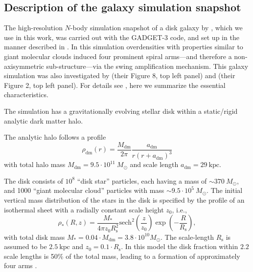 \documentclass[iop,revtex4,numberedappendix,appendixfloats]{emulateapj}
\begin{document}

\subsection{Description of the galaxy simulation snapshot} \label{sec:simulation_description}

The high-resolution $N$-body simulation snapshot of a disk galaxy by \citet{2013ApJ...766...34D}, which we use in this work, was carried out with the GADGET-3 code, and set up in the manner described in \citet{2005MNRAS.361..776S}. In this simulation overdensities with properties similar to giant molecular clouds induced four prominent spiral arms---and therefore a non-axisymmetric sub-structure---via the swing amplification mechanism. This galaxy simulation was also investigated by \citet{2013ApJ...766...34D} (their Figure 8, top left panel) and \citet{2015ApJ...808L...8D} (their Figure 2, top left panel). For details see \citet{2013ApJ...766...34D}, here we summarize the essential characteristics.

The simulation has a gravitationally evolving stellar disk within a static/rigid analytic dark matter halo.

The analytic halo follows a \citet{1990ApJ...356..359H} profile
\begin{equation}
\rho_\text{dm}(r) = \frac{M_\text{dm}}{2\pi} \frac{a_\text{dm}}{r (r+a_\text{dm})^3} \label{eq:dm_hernquist}
\end{equation}
with total halo mass $M_\text{dm} = 9.5\cdot 10^{11} ~M_\odot$ and scale length $a_\text{dm} = 29~\text{kpc}$.

The disk consists of $10^8$ ``disk star'' particles, each having a mass of $\sim370 ~M_\odot$, and 1000 ``giant molecular cloud'' particles with mass $\sim9.5\cdot 10^{5} ~M_\odot$. The initial vertical mass distribution of the stars in the disk is specified by the profile of an isothermal sheet with a radially constant scale height $z_0$, i.e.,
\begin{equation}
\rho_*(R,z) = \frac{M_*}{4\pi z_0 R_\text{s}^2} \text{sech}^2 \left( \frac{z}{z_0}\right) \exp \left(- \frac{R}{R_\text{s}} \right), \label{eq:sech_disk}
\end{equation}
with total disk mass $M_* = 0.04\cdot M_\text{dm} = 3.8\cdot 10^{10} M_\odot$. The scale-length $R_\text{s}$ is assumed to be $2.5~\text{kpc}$ and $z_0=0.1 \cdot R_\text{s}$. In this model the disk fraction within $2.2$ scale lengths is 50\% of the total mass, leading to a formation of approximately four arms \citep{2015ApJ...808L...8D}.
\end{document}
